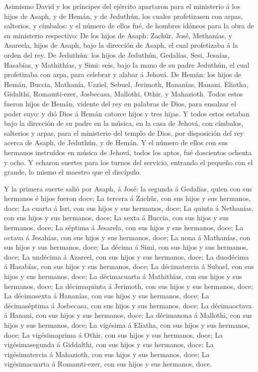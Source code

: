  Asimismo David y los príncipes del ejército apartaron para
el ministerio á los hijos de Asaph, y de Hemán, y de Jeduthún, los
cuales profetizasen con arpas, salterios, y címbalos: y el número de
ellos fué, de hombres idóneos para la obra de su ministerio respectivo:
 De los hijos de Asaph: Zachûr, José, Methanías, y Asareela,
hijos de Asaph, bajo la dirección de Asaph, el cual profetizaba á la
orden del rey.  De Jeduthún: los hijos de Jeduthún,
Gedalías, Sesi, Jesaías, Hasabías, y Mathithías, y Simi: seis, bajo la
mano de su padre Jeduthún, el cual profetizaba con arpa, para celebrar y
alabar á Jehová.  De Hemán: los hijos de Hemán, Buccia,
Mathanía, Uzziel, Sebuel, Jerimoth, Hananías, Hanani, Eliatha, Gidalthi,
Romamti-ezer, Josbecasa, Mallothi, Othir, y Mahazioth. 
Todos estos fueron hijos de Hemán, vidente del rey en palabras de Dios,
para ensalzar el poder suyo: y dió Dios á Hemán catorce hijos y tres
hijas.  Y todos estos estaban bajo la dirección de su padre
en la música, en la casa de Jehová, con címbalos, salterios y arpas,
para el ministerio del templo de Dios, por disposición del rey acerca de
Asaph, de Jeduthún, y de Hemán.  Y el número de ellos con
sus hermanos instruídos en música de Jehová, todos los aptos, fué
doscientos ochenta y ocho.  Y echaron suertes para los
turnos del servicio, entrando el pequeño con el grande, lo mismo el
maestro que el discípulo.

 Y la primera suerte salió por Asaph, á José: la segunda á
Gedalías, quien con sus hermanos é hijos fueron doce;  La
tercera á Zachûr, con sus hijos y sus hermanos, doce;  La
cuarta á Isri, con sus hijos y sus hermanos, doce;  La
quinta á Nethanías, con sus hijos y sus hermanos, doce;  La
sexta á Buccia, con sus hijos y sus hermanos, doce;  La
séptima á Jesarela, con sus hijos y sus hermanos, doce;  La
octava á Jesahías, con sus hijos y sus hermanos, doce;  La
nona á Mathanías, con sus hijos y sus hermanos, doce;  La
décima á Simi, con sus hijos y sus hermanos, doce;  La
undécima á Azareel, con sus hijos y sus hermanos, doce;  La
duodécima á Hasabías, con sus hijos y sus hermanos, doce; 
La décimatercia á Subael, con sus hijos y sus hermanos, doce;
 La décimacuarta á Mathithías, con sus hijos y sus
hermanos, doce;  La décimaquinta á Jerimoth, con sus hijos
y sus hermanos, doce;  La décimasexta á Hananías, con sus
hijos y sus hermanos, doce;  La décimaséptima á Josbecasa,
con sus hijos y sus hermanos, doce;  La décimaoctava á
Hanani, con sus hijos y sus hermanos, doce;  La décimanona
á Mallothi, con sus hijos y sus hermanos, doce;  La
vigésima á Eliatha, con sus hijos y sus hermanos, doce;  La
vigésimaprima á Othir, con sus hijos y sus hermanos, doce; 
La vigésimasegunda á Giddalthi, con sus hijos y sus hermanos, doce;
 La vigésimatercia á Mahazioth, con sus hijos y sus
hermanos, doce;  La vigésimacuarta á Romamti-ezer, con sus
hijos y sus hermanos, doce.

